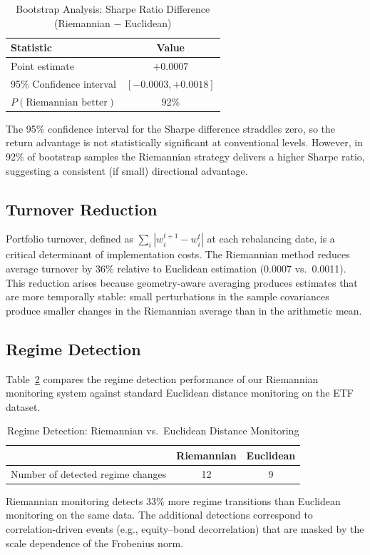 \documentclass[12pt,a4paper]{article}
\begin{document}
\begin{table}[htbp]
\centering
\caption{Bootstrap Analysis: Sharpe Ratio Difference (Riemannian $-$ Euclidean)}
\label{tab:bootstrap}
\begin{tabular}{lc}
\toprule
Statistic & Value \\
\midrule
Point estimate                  & $+0.0007$ \\
95\% Confidence interval        & $[-0.0003, +0.0018]$ \\
$P(\text{Riemannian better})$   & 92\% \\
\bottomrule
\end{tabular}
\medskip

{\small The 95\% confidence interval for the Sharpe difference straddles zero,
so the return advantage is not statistically significant at conventional levels.
However, in 92\% of bootstrap samples the Riemannian strategy delivers a higher
Sharpe ratio, suggesting a consistent (if small) directional advantage.}
\end{table}

\subsection{Turnover Reduction}

Portfolio turnover, defined as $\sum_i |w_i^{t+1} - w_i^t|$ at each
rebalancing date, is a critical determinant of implementation costs.
The Riemannian method reduces average turnover by 36\% relative to
Euclidean estimation (0.0007 vs.\ 0.0011). This reduction arises
because geometry-aware averaging produces estimates that are more
temporally stable: small perturbations in the sample covariances
produce smaller changes in the Riemannian average than in the
arithmetic mean.

\subsection{Regime Detection}

Table~\ref{tab:regimes} compares the regime detection performance of
our Riemannian monitoring system against standard Euclidean distance
monitoring on the ETF dataset.

\begin{table}[htbp]
\centering
\caption{Regime Detection: Riemannian vs.\ Euclidean Distance Monitoring}
\label{tab:regimes}
\begin{tabular}{lcc}
\toprule
 & Riemannian & Euclidean \\
\midrule
Number of detected regime changes      & 12  & 9 \\
\bottomrule
\end{tabular}
\medskip

{\small Riemannian monitoring detects 33\% more regime transitions
than Euclidean monitoring on the same data. The additional detections
correspond to correlation-driven events (e.g., equity--bond decorrelation)
that are masked by the scale dependence of the Frobenius norm.}
\end{table}
\end{document}
